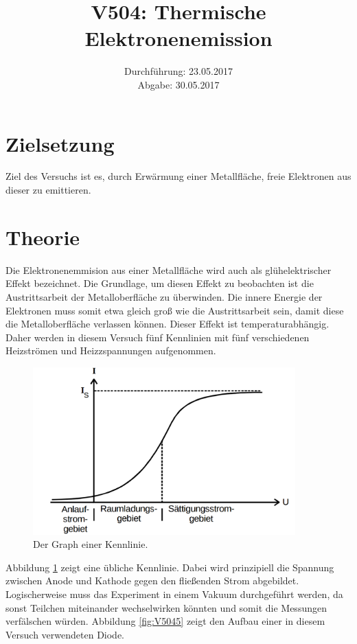 \documentclass[
  bibliography=totoc,     %
  captions=tableheading,  %
  titlepage=firstiscover, %
]{scrartcl}
\title{V504: Thermische Elektronenemission}
\author{
  Simon Schulte
  \texorpdfstring{
    \\
    \href{mailto:simon.schulte@udo.edu}{simon.schulte@udo.edu}
  }{}
  \texorpdfstring{\and}{, }
  Tim Sedlaczek
  \texorpdfstring{
    \\
    \href{mailto:tim.sedlaczek@udo.edu}{tim.sedlaczek@udo.edu}
  }{}
}
\date{Durchführung: 23.05.2017\\
      Abgabe: 30.05.2017}
\begin{document}
\maketitle
\thispagestyle{empty}
\tableofcontents
\newpage
\setcounter{page}{1}
\section{Zielsetzung}
\label{sec:zielsetzung}
Ziel des Versuchs ist es, durch Erwärmung einer Metallfläche, freie Elektronen aus dieser zu emittieren.
\section{Theorie}
\label{sec:theorie}
Die Elektronenemmision aus einer Metallfläche wird auch als glühelektrischer Effekt bezeichnet. Die Grundlage, um diesen Effekt zu beobachten ist die Austrittsarbeit der Metalloberfläche zu überwinden. Die innere Energie der Elektronen muss somit etwa gleich groß wie die Austrittsarbeit sein, damit diese die Metalloberfläche verlassen können. Dieser Effekt ist temperaturabhängig. Daher werden in diesem Versuch fünf Kennlinien mit fünf verschiedenen Heizströmen und Heizzspannungen aufgenommen.
\begin{figure}[htb]
  \centering
  \includegraphics[width=0.9\textwidth]{V5044.png}
  \caption{Der Graph einer Kennlinie. \cite{anleitung}}
  \label{fig:V5044}
\end{figure}
\noindent
Abbildung \ref{fig:V5044} zeigt eine übliche Kennlinie. Dabei wird prinzipiell  die Spannung zwischen Anode und Kathode gegen den fließenden Strom abgebildet. Logischerweise muss das Experiment in einem Vakuum durchgeführt werden, da sonst Teilchen miteinander wechselwirken könnten und somit die Messungen verfälschen würden. Abbildung \ref{fig:V5045} zeigt den Aufbau einer in diesem Versuch verwendeten Diode.
\end{document}
